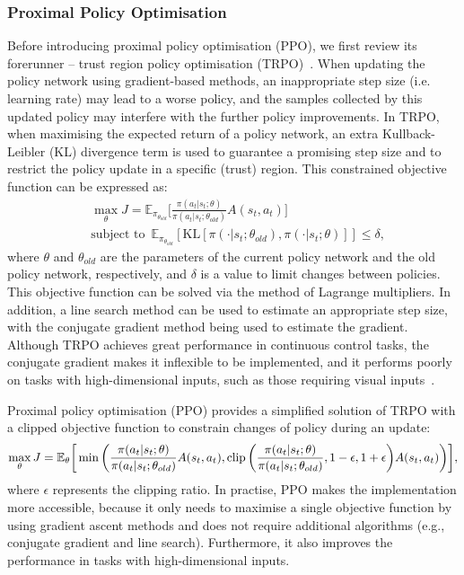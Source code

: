 \subsubsection{Proximal Policy Optimisation}
Before introducing proximal policy optimisation (PPO), we first review its forerunner -- trust region policy optimisation (TRPO)~\cite{schulman2015trust}. When updating the policy network using gradient-based methods, an inappropriate step size (i.e. learning rate) may lead to a worse policy, and the samples collected by this updated policy may interfere with the further policy improvements. In TRPO, when maximising the expected return of a policy network, an extra Kullback-Leibler (KL) divergence term is used to guarantee a promising step size and to restrict the policy update in a specific (trust) region. This constrained objective function can be expressed as:
\begin{align}
   & \max_{\theta} J = \mathbb{E}_{\pi_{\theta_{old}}}\biggr[\frac{\pi(a_{t}|s_{t};\theta)}{\pi(a_{t}|s_{t};\theta_{old})}A(s_{t},a_{t})\biggr] \\
   & \text{subject to} \enspace \mathbb{E}_{\pi_{\theta_{old}}}[\text{KL}[\pi(\cdot|s_{t};\theta_{old}), \pi(\cdot|s_{t};\theta)]] \leq \delta,
\end{align}
where $\theta$ and $\theta_{old}$ are the parameters of the current policy network and the old policy network, respectively, and $\delta$ is a value to limit changes between policies. This objective function can be solved via the method of Lagrange multipliers. In addition, a line search method can be used to estimate an appropriate step size, with the conjugate gradient method being used to estimate the gradient. Although TRPO achieves great performance in continuous control tasks, the conjugate gradient makes it inflexible to be implemented, and it performs poorly on tasks with high-dimensional inputs, such as those requiring visual inputs~\cite{schulman2017advanced}.

Proximal policy optimisation (PPO) provides a simplified solution of TRPO with a clipped objective function to constrain changes of policy during an update:
\begin{equation}
\centering
\max_{\theta}J = \mathbb{E}_{\theta}\biggr[\min\bigg (\frac{\pi(a_{t}|s_{t};\theta)}{\pi(a_{t}|s_{t};\theta_{old})}A(s_t, a_t),
	\clip \bigg(\frac{\pi(a_{t}|s_{t};\theta)}{\pi(a_{t}|s_{t};\theta_{old})}, 1-\epsilon, 1+\epsilon \bigg)A(s_t, a_t)\bigg )\biggr],
\label{eq:standard_ppo}
\end{equation}
where $\epsilon$ represents the clipping ratio. In practise, PPO makes the implementation more accessible, because it only needs to maximise a single objective function by using gradient ascent methods and does not require additional algorithms (e.g., conjugate gradient and line search). Furthermore, it also improves the performance in tasks with high-dimensional inputs.
